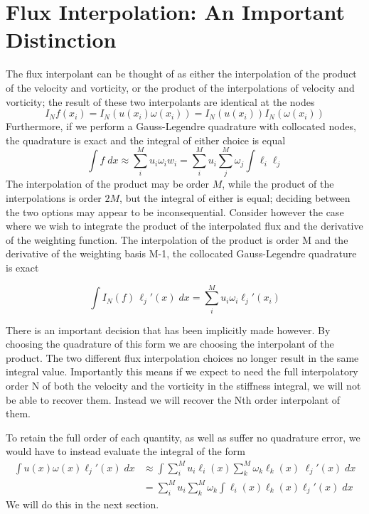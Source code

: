 \documentclass[letterpaper,12pt]{report}
\newcommand{\be}{\begin{equation}}
\newcommand{\ee}{\end{equation}}
\begin{document}
\section{Flux Interpolation: An Important Distinction}
The flux interpolant can be thought of  as either the interpolation of the product of the velocity and vorticity, or the product of the interpolations of velocity and vorticity; the result of these two interpolants are identical at the nodes
\be I_N f(x_i) = I_N(u(x_i) \omega(x_i)) = I_N(u(x_i)) I_N(\omega(x_i)) \ee
Furthermore, if we perform a Gauss-Legendre quadrature with collocated nodes, the quadrature is exact and the integral of either choice is equal
\be \int f \;dx \approx \sum_i^M u_i \omega_i w_i = \sum_i^M u_i \sum_j^M \omega_j \int \ell_i \ell_j \ee
The interpolation of the product may be order $M$, while the product of the interpolations is order $2M$, but the integral of either is equal; deciding between the two options may appear to be inconsequential. Consider however the case where we wish to integrate the product of the interpolated flux and the derivative of the weighting function. The interpolation of the product is order M and the derivative of the weighting basis M-1, the collocated Gauss-Legendre quadrature is exact

\be \int I_N(f) \, \ell_j'(x) \;dx = \sum_i^M u_i\omega_i \ell_j'(x_i) \ee

There is an important decision that has been implicitly made however. By choosing the quadrature of this form we are choosing the interpolant of the product. The two different flux interpolation choices no longer result in the same integral value. Importantly this means if we expect to need the full interpolatory order N of both the velocity and the vorticity in the stiffness integral, we will not be able to recover them. Instead we will recover the Nth order interpolant of them.

To retain the full order of each quantity, as well as suffer no quadrature error, we would have to instead evaluate the integral of the form
\be \begin{split}\int u(x) \omega(x) \ell_j'(x) \;dx &\approx \int \sum_i^M u_i \ell_i(x) \sum_k^M \omega_k \ell_k(x) \;\ell_j'(x) \;dx\\
&=\sum_i^M u_i \sum_k^M \omega_k \int \ell_i(x) \ell_k(x) \ell_j'(x) \;dx
\end{split}\ee
We will do this in the next section.
%
\end{document}
